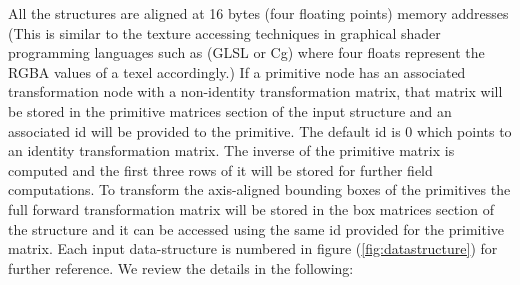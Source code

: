 All the structures are aligned at 16 bytes (four floating points) memory addresses (This is similar to the texture accessing techniques in graphical 
shader programming languages such as (GLSL or Cg) where four floats represent the RGBA values of a texel accordingly.) If a primitive node has an associated 
transformation node with a non-identity transformation matrix, that matrix will be stored in the primitive matrices section of the input structure and an associated 
id will be provided to the primitive. The default id is 0 which points to an identity transformation matrix. The inverse of the primitive matrix is 
computed and the first three rows of it will be stored for further field computations. To transform the axis-aligned bounding boxes of the primitives the full forward 
transformation matrix will be stored in the box matrices section of the structure and it can be accessed using the same id provided for the primitive matrix.
Each input data-structure is numbered in figure (\ref{fig:datastructure}) for further reference. We review the details in the following:
